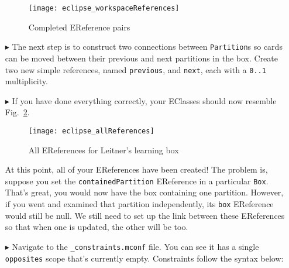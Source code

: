 \begin{itemize}
\begin{figure}[htbp]
	\centering
  \texttt{[image: eclipse\_workspaceReferences]}
	\caption{Completed EReference pairs}
	\label{eclipse:almostAllReferences}
\end{figure} 

\newpage

\item[$\blacktriangleright$] The next step is to construct two connections between \texttt{Partition}s so cards can be moved between their previous and next
partitions in the box. Create two new simple references, named \texttt{previous}, and \texttt{next}, each with a \texttt{0..1} multiplicity.

\vspace{0.5cm}

\item[$\blacktriangleright$] If you have done everything correctly, your EClasses should now resemble Fig.~\ref{eclipse:allReferences}. 

\vspace{0.5cm}

\begin{figure}[htbp]
	\centering
  \texttt{[image: eclipse\_allReferences]}
	\caption{All EReferences for Leitner's learning box}
	\label{eclipse:allReferences}
\end{figure} 

\clearpage

At this point, all of your EReferences have been created! The problem is, suppose you set the \texttt{containedPartition} EReference in a particular
\texttt{Box}. That's great, you would now have the box containing one partition. However, if you went and examined that partition independently, its
\texttt{box} EReference would still be null. We still need to set up the link between these EReferences so that when one is updated, the other will be too.

\vspace{0.5cm}

\item[$\blacktriangleright$] Navigate to the \texttt{\_constraints.mconf} file. You can see it has a single \texttt{opposites} scope that's currently empty.
Constraints follow the syntax below: 



\end{itemize}
